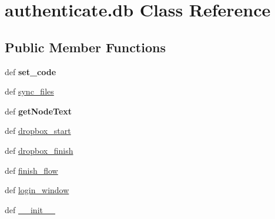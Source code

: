 \hypertarget{classauthenticate_1_1db}{\section{authenticate.\-db Class Reference}
\label{classauthenticate_1_1db}
}
\subsection*{Public Member Functions}
\begin{DoxyCompactItemize}
\item 
\hypertarget{classauthenticate_1_1db_aaf50cde8ecce54c63ee76cd9cc097b55}{def {\bfseries set\-\_\-code}}\label{classauthenticate_1_1db_aaf50cde8ecce54c63ee76cd9cc097b55}

\item 
def \hyperlink{classauthenticate_1_1db_a1a29fbc0d4886ec731bf66c61834469f}{sync\-\_\-files}
\item 
\hypertarget{classauthenticate_1_1db_a38c25295b57c0303fddd1ddbae1465c9}{def {\bfseries get\-Node\-Text}}\label{classauthenticate_1_1db_a38c25295b57c0303fddd1ddbae1465c9}

\item 
def \hyperlink{classauthenticate_1_1db_ad8e9b741251f7f568192ce88beab8b36}{dropbox\-\_\-start}
\item 
def \hyperlink{classauthenticate_1_1db_a9e79b1a35bad0774f6aac222d6bde47f}{dropbox\-\_\-finish}
\item 
def \hyperlink{classauthenticate_1_1db_a70a4ca9a1e85a7a9ea5ef88bbc3734d8}{finish\-\_\-flow}
\item 
def \hyperlink{classauthenticate_1_1db_abcea1ad93627e0be89bc2ecb5def54c1}{login\-\_\-window}
\item 
def \hyperlink{classauthenticate_1_1db_a89a1b669337ce57a151e5a7b4a886916}{\-\_\-\-\_\-init\-\_\-\-\_\-}
\end{DoxyCompactItemize}
